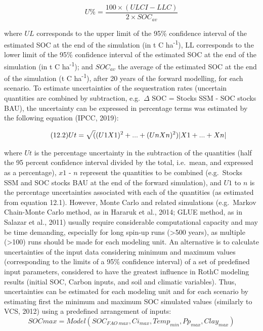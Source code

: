 \documentclass[
  10pt,
  b5paper,
]{book}
\begin{document}
\begin{equation}
\tag{12.1}
U \% = \frac{100 \times (ULCI-LLC)}{2 \times SOC_{av}}
\end{equation}

where \(UL\) corresponds to the upper limit of the 95\% confidence interval of the estimated SOC at the end of the simulation (in t C ha\textsuperscript{-1}), LL corresponds to the lower limit of the 95\% confidence interval of the estimated SOC at the end of the simulation (in t C ha\textsuperscript{-1}); and \(SOC_{av}\) the average of the estimated SOC at the end of the simulation (t C ha\textsuperscript{-1}), after 20 years of the forward modelling, for each scenario.
To estimate uncertainties of the sequestration rates (uncertain quantities are combined by subtraction, e.g.~\(\Delta\) SOC = Stocks SSM - SOC stocks BAU), the uncertainty can be expressed in percentage terms was estimated by the following equation (IPCC, 2019):

\begin{equation}
\tag{12.2}
Ut = \sqrt((U1X1)^2 + ... + (UnXn)^2) \\
|X1+ ... +Xn|
\end{equation}

where \(Ut\) is the percentage uncertainty in the subtraction of the quantities (half the 95 percent confidence interval divided by the total, i.e.~mean, and expressed as a percentage), \(x1\) - \(n\) represent the quantities to be combined (e.g.~Stocks SSM and SOC stocks BAU at the end of the forward simulation), and \(U1\) to \(n\) is the percentage uncertainties associated with each of the quantities (as estimated from equation 12.1).
However, Monte Carlo and related simulations (e.g.~Markov Chain-Monte Carlo method, as in Hararuk et al., 2014; GLUE method, as in Salazar et al., 2011) usually require considerable computational capacity and may be time demanding, especially for long spin-up runs (\textgreater500 years), as multiple (\textgreater100) runs should be made for each modeling unit.
An alternative is to calculate uncertainties of the input data considering minimum and maximum values (corresponding to the limits of a 95\% confidence interval) of a set of predefined input parameters, considered to have the greatest influence in RothC modeling results (initial SOC, Carbon inputs, and soil and climatic variables). Thus, uncertainties can be estimated for each modeling unit and for each scenario by estimating first the minimum and maximum SOC simulated values (similarly to VCS, 2012) using a predefined arrangement of inputs:
\begin{equation}
\tag{12.3}
SOC max = Model(SOC_{FAO \ max}, Ci_{max}, Temp_{min}, Pp_{max}, Clay_{max})       
\end{equation}
\end{document}
